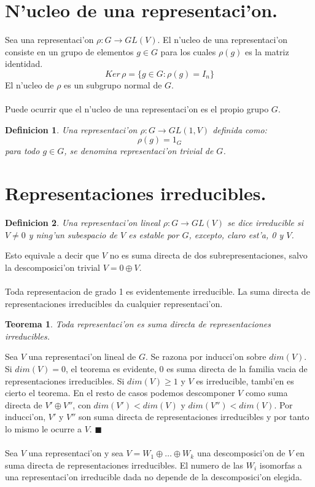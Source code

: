 \documentclass[a4paper,openright,12pt]{report}
\numberwithin{equation}{section} %
\newtheorem{teorema}{Teorema}[section] %
\newtheorem{definicion}{Definicion}[section] %
\newenvironment{proof}{\noindent{\it Demostracion:}}{\hfill$\blacksquare$} %
\begin{document}
\section{N'ucleo de una representaci'on.}
Sea una representaci'on $\rho : G \rightarrow GL(V)$. El n'ucleo de una representaci'on consiste en un grupo de elementos $g \in G$ 
para los cuales $\rho (g)$ es la matriz identidad.
\[
Ker \, \rho = \{ g \in G:\rho (g) = I_{n} \}
\]
El n'ucleo de $\rho$ es un subgrupo normal de $G$.\\
\\
Puede ocurrir que el n'ucleo de una representaci'on es el propio grupo $G$.
\begin{definicion}
Una representaci'on $\rho : G \rightarrow GL(1,V)$ definida como:
\[
\rho (g) = 1_{G}
\]
para todo $g \in G$, se denomina \textit{representaci'on trivial} de $G$.
\end{definicion} 
\section{Representaciones irreducibles.}
\begin{definicion}
Una representaci'on lineal $\rho : G \rightarrow GL(V)$ se dice \textit{irreducible} si $V \neq 0$ y ning'un subespacio de $V$ es estable por $G$, excepto, claro est'a, 0 y $V$. 
\end{definicion}
Esto equivale a decir que $V$ no es suma directa de dos subrepresentaciones, salvo la descomposici'on trivial $V=0\oplus V$.\\
\\
Toda representacion de grado 1 es evidentemente irreducible. La suma directa de representaciones irreducibles da cualquier representaci'on.
\begin{teorema}
Toda representaci'on es suma directa de representaciones irreducibles.
\end{teorema} 
\begin{proof}
Sea $V$ una representaci'on lineal de $G$. Se razona por inducci'on sobre $dim(V)$. Si $dim(V)=0$, el teorema es evidente, 0 es suma directa de la familia vacia de representaciones irreducibles. Si $dim(V)\geq 1$ y $V$ es irreducible, tambi'en es cierto el teorema. En el resto de casos podemos descomponer $V$ como suma directa de $V' \oplus V''$, con $dim(V')< dim(V)$ y $dim(V'')< dim(V)$. Por inducci'on, $V'$ y $V''$ son suma directa de representaciones irreducibles y por tanto lo mismo le ocurre a $V$.
\end{proof}\\
\\
Sea $V$ una representaci'on y sea $V=W_{1}\oplus \ldots \oplus W_{k}$ una descomposici'on de $V$ en suma directa de representaciones irreducibles. El numero de las $W_{i}$ isomorfas a una representaci'on irreducible dada no depende de la descomposici'on elegida. 
\end{document}
